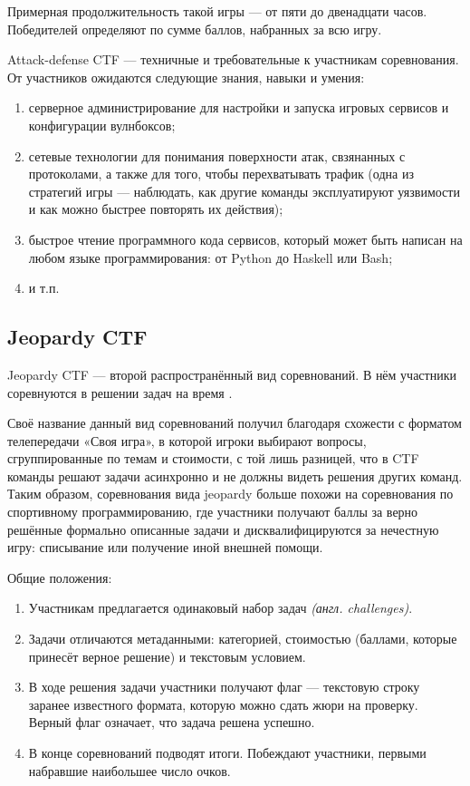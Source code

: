 Примерная продолжительность такой игры --- от пяти до двенадцати часов. Победителей определяют по сумме баллов, набранных за всю игру.

Attack-defense CTF — техничные и требовательные к участникам соревнования. От участников ожидаются следующие знания, навыки и умения:
\begin{enumerate}
  \item серверное администрирование для настройки и запуска игровых сервисов и конфигурации вулнбоксов;
  \item сетевые технологии для понимания поверхности атак, свзянанных с протоколами, а также для того, чтобы перехватывать трафик (одна из стратегий игры --- наблюдать, как другие команды эксплуатируют уязвимости и как можно быстрее повторять их действия\cite{ReplayAttacks});
  \item быстрое чтение программного кода сервисов, который может быть написан на любом языке программирования: от Python\cite{PythonService} до Haskell\cite{HaskellSerivce} или Bash\cite{BashService};
  \item и т.п.
\end{enumerate}




\subsection{Jeopardy CTF}

Jeopardy CTF — второй распространённый вид соревнований. В нём участники соревнуются в решении задач на время \cite{Course}.

Своё название данный вид соревнований получил благодаря схожести с форматом телепередачи «Своя игра», в которой игроки выбирают вопросы, сгруппированные по темам и стоимости, с той лишь разницей, что в CTF команды решают задачи асинхронно и не должны видеть решения других команд. Таким образом, соревнования вида jeopardy больше похожи на соревнования по спортивному программированию, где участники получают баллы за верно решённые формально описанные задачи и дисквалифицируются за нечестную игру: списывание или получение иной внешней помощи.

Общие положения:

\begin{enumerate}
  \item Участникам предлагается одинаковый набор задач \textit{(англ. challenges)}.
  \item Задачи отличаются метаданными: категорией, стоимостью (баллами, которые принесёт верное решение) и текстовым условием.
  \item В ходе решения задачи участники получают флаг — текстовую строку заранее известного формата, которую можно сдать жюри на проверку. Верный флаг означает, что задача решена успешно.
  \item В конце соревнований подводят итоги. Побеждают участники, первыми набравшие наибольшее число очков.
\end{enumerate}

